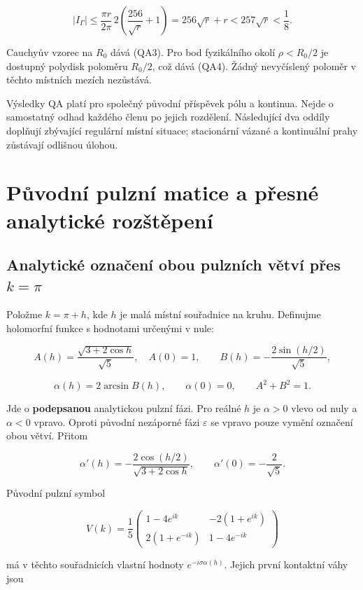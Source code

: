 \documentclass[11pt,a4paper]{article}
\theoremstyle{remark}\newtheorem{remark}[theorem]{Poznámka}
\numberwithin{equation}{section}
\begin{document}
\[
|I_\Gamma|
\le\frac{\pi r}{2\pi}\,2\left(\frac{256}{\sqrt r}+1\right)
=256\sqrt r+r<257\sqrt r<\frac18.
\tag{QA23}
\]

Cauchyův vzorec na \(R_0\) dává (QA3). Pro bod fyzikálního okolí
\(\rho<R_0/2\) je dostupný polydisk poloměru \(R_0/2\), což dává (QA4).
Žádný nevyčíslený poloměr v těchto místních mezích nezůstává.

Výsledky QA platí pro společný původní příspěvek pólu
a kontinua. Nejde o samostatný odhad každého členu po
jejich rozdělení. Následující dva oddíly doplňují zbývající
regulární místní situace; stacionární vázané a kontinuální
prahy zůstávají odlišnou úlohou.

\section{Původní pulzní matice a přesné analytické rozštěpení}
\hypertarget{analytickuxe9-oznaux10denuxed-obou-pulznuxedch-vux11btvuxed-pux159es-kpi}{%
\subsection{\texorpdfstring{Analytické označení obou pulzních větví přes
\(k=\pi\)}{Analytické označení obou pulzních větví přes k=\textbackslash pi}}\label{analytickuxe9-oznaux10denuxed-obou-pulznuxedch-vux11btvuxed-pux159es-kpi}}

Položme \(k=\pi+h\), kde \(h\) je malá místní souřadnice na kruhu.
Definujme holomorfní funkce s hodnotami určenými v nule:

\[
A(h)=\frac{\sqrt{3+2\cos h}}{\sqrt5},\quad A(0)=1,
\qquad B(h)=-\frac{2\sin(h/2)}{\sqrt5},
\]

\[
\alpha(h)=2\arcsin B(h),\qquad \alpha(0)=0,
\qquad A^2+B^2=1.
\tag{KP13}
\]

Jde o \textbf{podepsanou} analytickou pulzní fázi. Pro reálné \(h\) je
\(\alpha>0\) vlevo od nuly a \(\alpha<0\) vpravo. Oproti původní
nezáporné fázi \(\varepsilon\) se vpravo pouze vymění označení obou
větví. Přitom

\[
\alpha'(h)=-\frac{2\cos(h/2)}{\sqrt{3+2\cos h}},\qquad
\alpha'(0)=-\frac2{\sqrt5}.
\tag{KP14}
\]

Původní pulzní symbol

\[
V(k)=\frac15\begin{pmatrix}
1-4e^{ik}&-2(1+e^{ik})\\
2(1+e^{-ik})&1-4e^{-ik}
\end{pmatrix}
\]

má v těchto souřadnicích vlastní hodnoty \(e^{-i\sigma\alpha(h)}\).
Jejich první kontaktní váhy jsou
\end{document}
